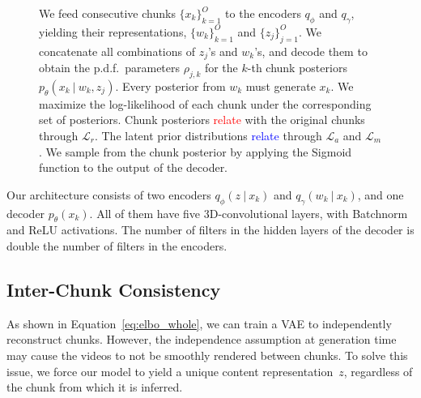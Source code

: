 \documentclass[journal]{IEEEtran}
\newcommand\givenbase[1][]{\:#1\lvert\:}
\let\given\givenbase
\begin{document}
\begin{figure}[tb]%
  \centering%
  \resizebox{\linewidth}{!}{}
 \caption{%
  We feed consecutive chunks $\{x_k\}_{k=1}^O$ to the encoders $q_\phi$ and $q_\gamma$, yielding their representations, $\{w_k\}_{k=1}^O$ and $\{z_j\}_{j=1}^O$.
  We concatenate all combinations of $z_j$'s and $w_k$'s, and decode them to obtain the p.d.f.\ parameters $\rho_{j,k}$ for the $k$-th chunk posteriors $p_\theta(x_k \given w_k, z_j)$.
  Every posterior from $w_k$ must generate $x_k$.
  We maximize the log-likelihood of each chunk under the corresponding set of posteriors.
  Chunk posteriors \textcolor{red}{relate} with the original chunks through $\mathcal{L}_r$.
  The latent prior distributions \textcolor{blue}{relate} through $\mathcal{L}_a$ and $\mathcal{L}_m$.
  We \textcolor{blue!40!green}{sample} from the chunk posterior by applying the Sigmoid function to the output of the decoder.
  }
  \label{fig:logp}%
\end{figure}

Our architecture consists of two encoders $q_\phi(z \given x_{k})$ and $q_\gamma(w_k \given x_{k})$, and one decoder $p_\theta(x_{k})$\@.
All of them have five 3D-convolutional layers, with Batchnorm and ReLU activations.
The number of filters in the hidden layers of the decoder is double the number of filters in the encoders.

\subsection{Inter-Chunk Consistency}
\label{sec:inter-chunk-consistency}

As shown in Equation~\ref{eq:elbo_whole}, we can train a VAE to independently reconstruct chunks.
However, the independence assumption at generation time may cause the videos to not be smoothly rendered between chunks.
To solve this issue, we force our model to yield a unique content representation~$z$, regardless of the chunk from which it is inferred.
\end{document}
